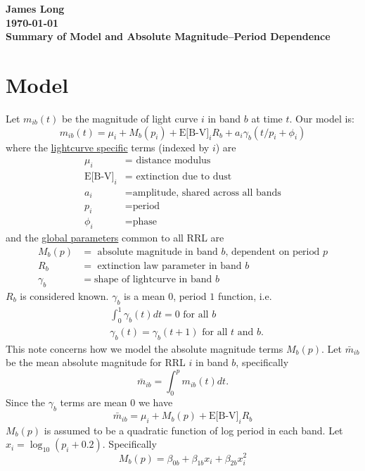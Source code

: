 \documentclass[12pt]{article}
\title{}
\date{}
\author{}
\begin{document}
\noindent
\textbf{James Long}\\
\textbf{\today}\\
\textbf{Summary of Model and Absolute Magnitude--Period Dependence}


\section{Model}

Let $m_{ib}(t)$ be the magnitude of light curve $i$ in band $b$ at time $t$. Our model is:
\begin{equation*}
m_{ib}(t) = \mu_i + M_{b}(p_i) + \text{E[B-V]}_iR_b + a_i\gamma_b(t/p_i + \phi_i)
\end{equation*}
where the \underline{lightcurve specific} terms (indexed by $i$) are 
\begin{align*}
  \mu_i &= \text{ distance modulus }\\
  \text{E[B-V]}_i &= \text{ extinction due to dust }\\
  a_i &= \text{amplitude, shared across all bands}\\
  p_i &= \text{period}\\
  \phi_i &= \text{phase}
\end{align*}
and the \underline{global parameters} common to all RRL are
\begin{align*}
  M_{b}(p) &= \text{ absolute magnitude in band $b$, dependent on period } p\\
  R_b &= \text{ extinction law parameter in band $b$}\\
  \gamma_b &= \text{shape of lightcurve in band $b$}
\end{align*}
$R_b$ is considered known. $\gamma_b$ is a mean $0$, period $1$ function, i.e.
\begin{align*}
  &\int_0^1 \gamma_b(t) dt = 0 \text{ for all } b\\
  &\gamma_b(t) = \gamma_b(t + 1) \text{ for all } t \text{ and } b.
\end{align*}
This note concerns how we model the absolute magnitude terms $M_b(p)$. Let $\bar{m}_{ib}$ be the mean absolute magnitude for RRL $i$ in band $b$, specifically
\begin{equation*}
  \bar{m}_{ib} = \int_0^p m_{ib}(t) dt.
\end{equation*}
Since the $\gamma_b$ terms are mean $0$ we have
\begin{equation*}
\bar{m}_{ib} = \mu_i + M_{b}(p) + \text{E[B-V]}_iR_b
\end{equation*}
$M_{b}(p)$ is assumed to be a quadratic function of log period in each band. Let $x_i = \log_{10}(p_i + 0.2)$. Specifically
\begin{equation*}
  M_{b}(p) = \beta_{0b} + \beta_{1b}x_i  + \beta_{2b}x_i^2
\end{equation*}
\end{document}
